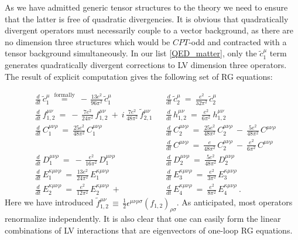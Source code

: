 \documentclass[12pt,preprintnumbers,nofootinbib]{revtex4}
\newcommand{\wt}{\widetilde}
\begin{document}
	As we have admitted generic tensor structures to the theory
	we need to ensure that the latter is free of quadratic divergencies.
	It is obvious that quadratically divergent operators must necessarily
	couple to a vector background, as there are no dimension
	three structures which would be $CPT$-odd and contracted with a tensor
	background simultaneously. 
	In our list \eqref{QED_matter}, only the $ \wt{c}_1^\mu $ term generates 
quadratically divergent corrections to LV dimension three operators. The result 
of explicit computation gives the following set of RG equations:

\begin{align*}
	&
	\frac{d} {d t}\, \wt{c}_1^\mu ~\overset{\text{formally}}{=}~
		-\, \frac{13e^2}{96\pi^2}\, \wt{c}_1^\mu
	&&
	\frac{d} {d t}\, \wt{c}_2^\mu ~=~
		\frac{e^2}{32\pi^2}\, \wt{c}_2^\mu
	\\
	&
	\frac{d} {d t}\, f_{1,2}^{\mu\nu} ~=~
		-\, \frac{7e^2}{24\pi^2}\, f_{1,2}^{\mu\nu}
		~+~
		i\, \frac{7e^2}{48\pi^2}\, \wt{f}{}_{2,1}^{\mu\nu}
	&&
	\frac{d} {d t}\, h_{1,2}^{\mu\nu} ~=~
		\frac{e^2}{6\pi^2}\ h_{1,2}^{\mu\nu} 
	\\
	&
	\frac{d} {d t}\, C_1^{\mu\nu\rho} ~=~
		\frac{25e^2}{48\pi^2}\, C_1^{\mu\nu\rho}
	&&
	\frac{d} {d t}\, C_2^{\mu\nu\rho} ~=~
		\frac{25e^2}{48\pi^2}\, C_2^{\mu\nu\rho}
		~-~
		\frac{5e^2}{48\pi^2}\, C^{\mu\nu\rho}
	\\
	&&&
	\frac{d} {d t}\, C^{\mu\nu\rho} ~=~
		\frac{e}{48\pi^2}\, C_2^{\mu\nu\rho} 
		~-~
		\frac{e^2}{6\pi^2}\, C^{\mu\nu\rho}
	\\
	&
	\frac{d} {d t}\, D_1^{\mu\nu\rho} ~=~
		-\, \frac{e^2}{16\pi^2}\, D_1^{\mu\nu\rho}
	&&
	\frac{d} {d t}\, D_2^{\mu\nu\rho} ~=~
		\frac{5e^2}{48\pi^2}\, D_2^{\mu\nu\rho}
	\\
	&
	\frac{d} {d t}\, E_1^{\kappa\mu\nu\rho} ~=~
		\frac{13e^2}{24\pi^2}\, E_1^{\kappa\mu\nu\rho}
	&&
	\frac{d} {d t}\, E_3^{\kappa\mu\nu\rho} ~=~
		\frac{e^2}{3\pi^2}\, E_3^{\kappa\mu\nu\rho}
	\\
	&
	\frac{d} {d t}\, E_2^{\kappa\mu\nu\rho} ~=~
		\frac{e^2}{12\pi^2}\, E_2^{\kappa\mu\nu\rho}
		~+~      
	&&
	\frac{d} {d t}\, E_4^{\kappa\mu\nu\rho} ~=~
		\frac{e^2}{8\pi^2}\, E_4^{\kappa\mu\nu\rho}
	~.
\end{align*}	
	Here we have introduced $ \wt{f}{}_{1,2}^{\mu\nu} \,\equiv\, \frac{1}{2} 
		\epsilon^{\mu\nu\rho\sigma} (f_{1,2})_{\rho\sigma} $.
	As anticipated, most operators renormalize independently.
	It is also clear that one can easily form the linear combinations
	of LV interactions that are eigenvectors of one-loop RG equations.
\end{document}
